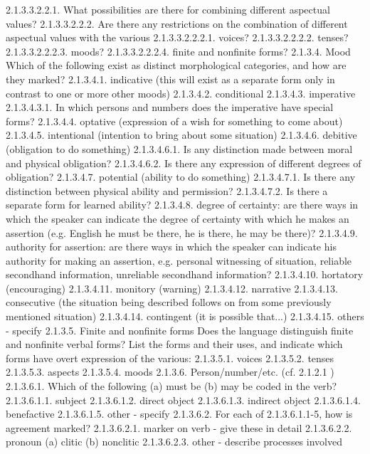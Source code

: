2.1.3.3.2.2.1. What possibilities are there for combining different aspectual values?
2.1.3.3.2.2.2. Are there any restrictions on the combination of different aspectual values with the various
2.1.3.3.2.2.2.1. voices?
2.1.3.3.2.2.2.2. tenses?
2.1.3.3.2.2.2.3. moods?
2.1.3.3.2.2.2.4. finite and nonfinite forms?
2.1.3.4. Mood
Which of the following exist as distinct morphological categories, and how are they marked?
2.1.3.4.1. indicative (this will exist as a separate form only in contrast to one or more other moods)
2.1.3.4.2. conditional
2.1.3.4.3. imperative
2.1.3.4.3.1. In which persons and numbers does the imperative have special forms?
2.1.3.4.4. optative (expression of a wish for something to come about)
2.1.3.4.5. intentional (intention to bring about some situation)
2.1.3.4.6. debitive (obligation to do something)
2.1.3.4.6.1. Is any distinction made between moral and physical obligation?
2.1.3.4.6.2. Is there any expression of different degrees of obligation?
2.1.3.4.7. potential (ability to do something)
2.1.3.4.7.1. Is there any distinction between physical ability and permission?
2.1.3.4.7.2. Is there a separate form for learned ability?
2.1.3.4.8. degree of certainty: are there ways in which the speaker can indicate the degree of certainty with which he makes an assertion (e.g. English he must be there, he is there, he may be there)?
2.1.3.4.9. authority for assertion: are there ways in which the speaker can indicate his authority for making an assertion, e.g. personal witnessing of situation, reliable secondhand information, unreliable secondhand information?
2.1.3.4.10. hortatory (encouraging)
2.1.3.4.11. monitory (warning)
2.1.3.4.12. narrative
2.1.3.4.13. consecutive (the situation being described follows on from some previously mentioned situation)
2.1.3.4.14. contingent (it is possible that...)
2.1.3.4.15. others - specify
2.1.3.5. Finite and nonfinite forms
Does the language distinguish finite and nonfinite verbal forms? List the forms and their uses, and indicate which forms have overt expression of the various:
2.1.3.5.1. voices
2.1.3.5.2. tenses
2.1.3.5.3. aspects
2.1.3.5.4. moods
2.1.3.6. Person/number/etc. (cf. 2.1.2.1 )
2.1.3.6.1. Which of the following (a) must be (b) may be coded in the verb?
2.1.3.6.1.1. subject
2.1.3.6.1.2. direct object
2.1.3.6.1.3. indirect object
2.1.3.6.1.4. benefactive
2.1.3.6.1.5. other - specify
2.1.3.6.2. For each of 2.1.3.6.1.1-5, how is agreement marked?
2.1.3.6.2.1. marker on verb - give these in detail
2.1.3.6.2.2. pronoun (a) clitic (b) nonclitic
2.1.3.6.2.3. other - describe processes involved
